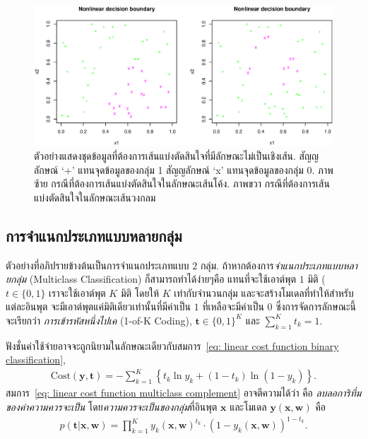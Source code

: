 % 
\begin{figure}
\begin{center}
\includegraphics[width=5.5in]{03Linear/nonlinDecisionBoundary.eps}
\end{center}
\caption{ตัวอย่างแสดงชุดข้อมูลที่ต้องการเส้นแบ่งตัดสินใจที่มีลักษณะไม่เป็นเชิงเส้น.
สัญญลักษณ์ `+' แทนจุดข้อมูลของกลุ่ม 1
สัญญลักษณ์ `x' แทนจุดข้อมูลของกลุ่ม 0.
ภาพซ้าย กรณีที่ต้องการเส้นแบ่งตัดสินใจในลักษณะเส้นโค้ง.
ภาพขวา กรณีที่ต้องการเส้นแบ่งตัดสินใจในลักษณะเส้นวงกลม}
\label{fig: linear classification nonlinear decision boundary}
\end{figure}
%

\subsection{การจำแนกประเภทแบบหลายกลุ่ม}
\label{section: multiclass classification}

ตัวอย่างที่อภิปรายข้างต้นเป็นการจำแนกประเภทแบบ $2$ กลุ่ม.
ถ้าหากต้องการ\textit{จำแนกประเภทแบบหลายกลุ่ม} (Multiclass Classification) 
ก็สามารถทำได้ง่ายๆคือ แทนที่จะใช้เอาต์พุต $1$ มิติ ($t \in \{0, 1\}$ เราจะใช้เอาต์พุต $K$ มิติ 
โดยให้ $K$ เท่ากับจำนวนกลุ่ม
และจะสร้างโมเดลที่ทำให้สำหรับแต่ละอินพุต จะมีเอาต์พุตแค่มิติเดียวเท่านั้นที่มีค่าเป็น $1$ ที่เหลือจะมีค่าเป็น $0$
ซึ่งการจัดการลักษณะนี้จะเรียกว่า \textit{การเข้ารหัสหนึ่งไปเค} (1-of-K Coding), 
$\mathbf{t} \in \{0,1\}^K$  และ $\sum_{k=1}^K t_k = 1$.

ฟังชั่นค่าใช้จ่ายอาจจะถูกนิยามในลักษณะเดียวกับสมการ~\ref{eq: linear cost function binary classification},
%
\begin{eqnarray}
\mathrm{Cost}(\mathbf{y}, \mathbf{t}) = -\sum_{k=1}^K \left\{ t_k \ln y_k + (1-t_k) \ln (1 - y_k) \right\}.
\label{eq: linear cost function multiclass complement}
\end{eqnarray}
%
สมการ~\ref{eq: linear cost function multiclass complement} อาจตีความได้ว่า 
คือ \textit{ลบลอการิทึ่มของค่าความควรจะเป็น} โดย\textit{ความควรจะเป็นของกลุ่ม}ที่อินพุต $\mathbf{x}$ และโมเดล $\mathbf{y}(\mathbf{x}, \mathbf{w})$ คือ
%
\begin{eqnarray}
   p(\mathbf{t}|\mathbf{x}, \mathbf{w}) = \prod_{k=1}^K y_k (\mathbf{x}, \mathbf{w})^{t_k} \cdot \left( 1 - y_k(\mathbf{x}, \mathbf{w}) \right)^{1-t_k}.
\label{eq: linear likelihood function multiclass complement}
\end{eqnarray}


